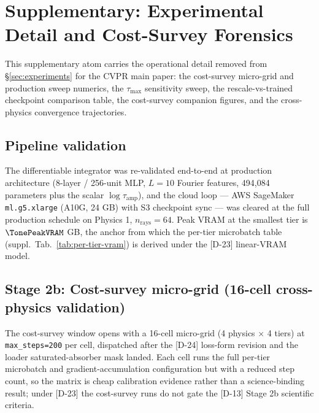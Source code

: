 \section{Supplementary: Experimental Detail and Cost-Survey Forensics}
\label{sec:suppl:experiments}

This supplementary atom carries the operational detail removed from \S\ref{sec:experiments} for the CVPR main paper: the cost-survey micro-grid and production sweep numerics, the $\tau_{\max}$ sensitivity sweep, the rescale-vs-trained checkpoint comparison table, the cost-survey companion figures, and the cross-physics convergence trajectories.

\subsection{Pipeline validation}
\label{sec:suppl:exp:pipeline}
The differentiable integrator was re-validated end-to-end at production architecture (8-layer / 256-unit MLP, $L = 10$ Fourier features, 494{,}084 parameters plus the scalar $\log\tau_{\text{amp}}$), and the cloud loop --- AWS SageMaker \texttt{ml.g5.xlarge} (A10G, 24 GB) with S3 checkpoint sync --- was cleared at the full production schedule on Physics 1, $n_{\text{rays}} = 64$. Peak VRAM at the smallest tier is $\TonePeakVRAM$ GB, the anchor from which the per-tier microbatch table (suppl.\ Tab.~\ref{tab:per-tier-vram}) is derived under the [D-23] linear-VRAM model.

\subsection{Stage 2b: Cost-survey micro-grid (16-cell cross-physics validation)}
\label{sec:suppl:exp:microgrid}
The cost-survey window opens with a 16-cell micro-grid (4 physics $\times$ 4 tiers) at \texttt{max\_steps=200} per cell, dispatched after the [D-24] loss-form revision and the loader saturated-absorber mask landed. Each cell runs the full per-tier microbatch and gradient-accumulation configuration but with a reduced step count, so the matrix is cheap calibration evidence rather than a science-binding result; under [D-23] the cost-survey runs do not gate the [D-13] Stage 2b scientific criteria.

